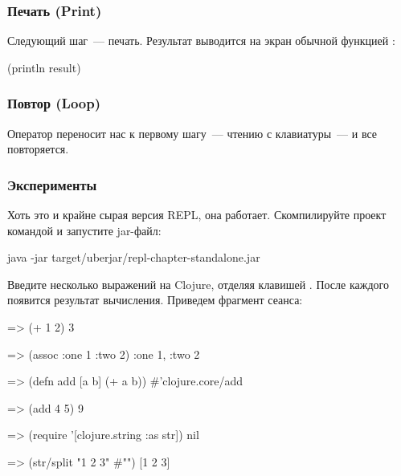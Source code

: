\subsubsection{Печать (Print)}


Следующий шаг~--- печать. Результат  выводится на экран обычной функцией :

\begin{english}
  \begin{clojure}
(println result)
  \end{clojure}
\end{english}

\subsubsection{Повтор (Loop)}


Оператор  переносит нас к первому шагу~--- чтению с клавиатуры~--- и все повторяется.

\subsubsection{Эксперименты}

Хоть это и крайне сырая версия REPL, она работает. Скомпилируйте проект командой  и запустите jar-файл:

\begin{english}
  \begin{clojure}
java -jar target/uberjar/repl-chapter-standalone.jar
  \end{clojure}
\end{english}

Введите несколько выражений на Clojure, отделяя клавишей \enter. После каждого появится результат вычисления. Приведем фрагмент сеанса:

\begin{english}
  \begin{clojure}
=> (+ 1 2)
3

=> (assoc {:one 1} :two 2)
{:one 1, :two 2}

=> (defn add [a b] (+ a b))
#'clojure.core/add

=> (add 4 5)
9

=> (require '[clojure.string :as str])
nil

=> (str/split "1 2 3" #"\s")
[1 2 3]
  \end{clojure}
\end{english}

